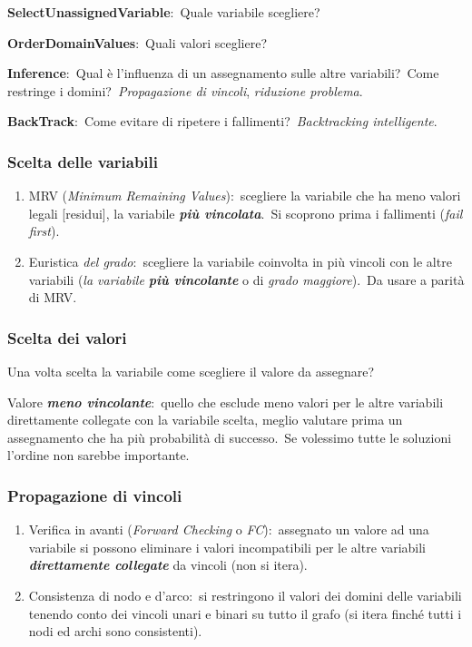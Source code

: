 \noindent\textbf{SelectUnassignedVariable}:\ Quale variabile scegliere?

\noindent\textbf{OrderDomainValues}:\ Quali valori scegliere?

\noindent\textbf{Inference}:\ Qual è l'influenza di un assegnamento sulle altre variabili?\ Come restringe i domini?\ \textit{Propagazione di vincoli}, \textit{riduzione problema}.

\noindent\textbf{BackTrack}:\ Come evitare di ripetere i fallimenti?\ \textit{Backtracking intelligente}.

\subsubsection{Scelta delle variabili}

\begin{enumerate}
	\item MRV (\textit{Minimum Remaining Values}):\ scegliere la variabile che ha meno valori legali [residui], la variabile \textbf{\textit{più vincolata}}.\ Si scoprono prima i fallimenti (\textit{fail first}).
	\item Euristica \textit{del grado}:\ scegliere la variabile coinvolta in più vincoli con le altre variabili (\textit{la variabile \textbf{più vincolante}} o di \textit{grado maggiore}).\ Da usare a parità di MRV.
\end{enumerate}

\subsubsection{Scelta dei valori}

Una volta scelta la variabile come scegliere il valore da assegnare?\

Valore \textbf{\textit{meno vincolante}}:\ quello che esclude meno valori per le altre variabili direttamente collegate con la variabile scelta, meglio valutare prima un assegnamento che ha più probabilità di successo.\
Se volessimo tutte le soluzioni l'ordine non sarebbe importante.

\subsubsection{Propagazione di vincoli}

\begin{enumerate}
	\item Verifica in avanti (\textit{Forward Checking} o \textit{FC}):\ assegnato un valore ad una variabile si possono eliminare i valori incompatibili per le altre variabili \textbf{\textit{direttamente collegate}} da vincoli (non si itera).
	\item Consistenza di nodo e d'arco:\ si restringono il valori dei domini delle variabili tenendo conto dei vincoli unari e binari su tutto il grafo (si itera finché tutti i nodi ed archi sono consistenti).
\end{enumerate}

